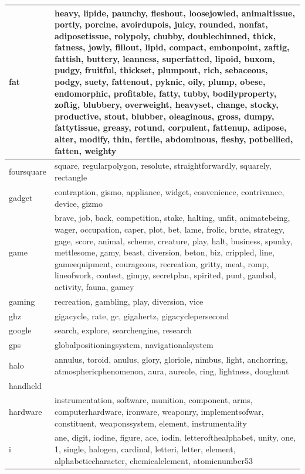 \documentclass[12pt,a4paper]{report}
\begin{document}
\begin{table}[H]
\begin{center}
\begin{tabular}{|l|l|}
fat & heavy, lipide, paunchy, fleshout, loosejowled, animaltissue, portly, porcine, avoirdupois, juicy, rounded, nonfat, adiposetissue, rolypoly, chubby, doublechinned, thick, fatness, jowly, fillout, lipid, compact, embonpoint, zaftig, fattish, buttery, leanness, superfatted, lipoid, buxom, pudgy, fruitful, thickset, plumpout, rich, sebaceous, podgy, suety, fattenout, pyknic, oily, plump, obese, endomorphic, profitable, fatty, tubby, bodilyproperty, zoftig, blubbery, overweight, heavyset, change, stocky, productive, stout, blubber, oleaginous, gross, dumpy, fattytissue, greasy, rotund, corpulent, fattenup, adipose, alter, modify, thin, fertile, abdominous, fleshy, potbellied, fatten, weighty\\
\hline
foursquare & square, regularpolygon, resolute, straightforwardly, squarely, rectangle\\
\hline
gadget & contraption, gismo, appliance, widget, convenience, contrivance, device, gizmo\\
\hline
game & brave, job, back, competition, stake, halting, unfit, animatebeing, wager, occupation, caper, plot, bet, lame, frolic, brute, strategy, gage, score, animal, scheme, creature, play, halt, business, spunky, mettlesome, gamy, beast, diversion, beton, biz, crippled, line, gameequipment, courageous, recreation, gritty, meat, romp, lineofwork, contest, gimpy, secretplan, spirited, punt, gambol, activity, fauna, gamey\\
\hline
gaming & recreation, gambling, play, diversion, vice\\
\hline
ghz & gigacycle, rate, gc, gigahertz, gigacyclepersecond\\
\hline
google & search, explore, searchengine, research\\
\hline
gps & globalpositioningsystem, navigationalsystem\\
\hline
halo & annulus, toroid, anulus, glory, gloriole, nimbus, light, anchorring, atmosphericphenomenon, aura, aureole, ring, lightness, doughnut\\
\hline
handheld & \\
\hline
hardware & instrumentation, software, munition, component, arms, computerhardware, ironware, weaponry, implementsofwar, constituent, weaponssystem, element, instrumentality\\
\hline
i & ane, digit, iodine, figure, ace, iodin, letterofthealphabet, unity, one, 1, single, halogen, cardinal, letteri, letter, element, alphabeticcharacter, chemicalelement, atomicnumber53\\
\hline

\end{tabular}
\end{center}
\end{table}
\end{document}
